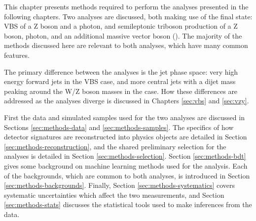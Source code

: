 
This chapter presents methods required to perform the analyses presented in the
following chapters. Two analyses are discussed, both making use of the \Zyjj
final state: \acs{VBS} of a Z boson and a photon, and semileptonic triboson
production of a Z boson, photon, and an additional massive vector boson (\VZy).
The majority of the methods discussed here are relevant to both analyses, which
have many common features. 

The primary difference between the analyses is the jet phase space:
very high energy forward jets in the \ac{VBS} \Zy case, and more central jets
with a dijet mass peaking around the W/Z boson masses in the \VZy case.
How these differences are addressed as the analyses diverge is discussed in
Chapters \ref{sec:vbs} and \ref{sec:vzy}.

First the data and simulated samples used for the two analyses are discussed in
Sections \ref{sec:methods-data} and \ref{sec:methods-samples}. The specifics of
how detector signatures are reconstructed into physics objects are detailed in
Section \ref{sec:methods-reconstruction}, and the shared preliminary selection
for the analyses is detailed in Section \ref{sec:methods-selection}.  Section
\ref{sec:methods-bdt} gives some background on machine learning methods used for
the \VZy analysis. Each of the backgrounds, which are common to both analyses,
is introduced in Section \ref{sec:methods-backgrounds}. Finally, Section
\ref{sec:methods-systematics} covers systematic uncertainties which affect the
two measurements, and Section \ref{sec:methods-stats} discusses the statistical
tools used to make inferences from the data.


